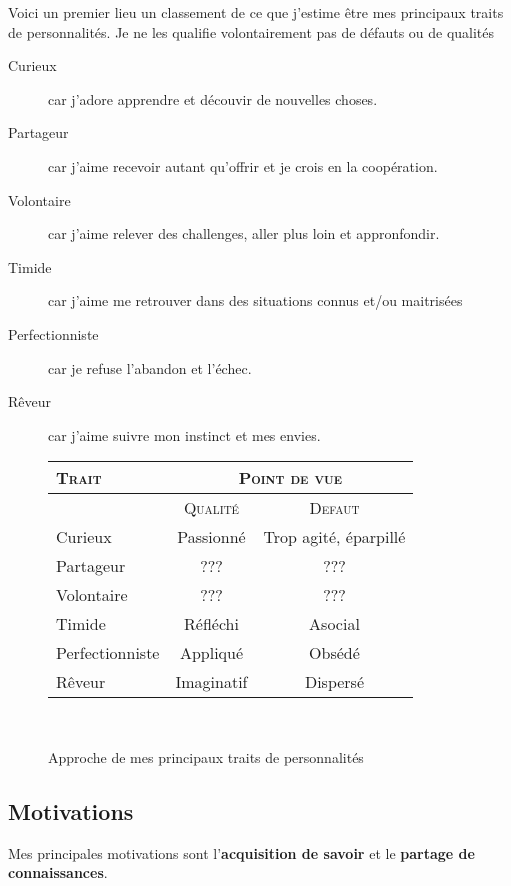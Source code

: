 \documentclass[a4paper,12pt, draft]{report}
\newcommand{\tabTitle}[1]{\hfill{} \textsc{#1} \hfill{} }
\begin{document}
Voici un premier lieu un classement de ce que j'estime être mes principaux traits de personnalités. Je ne les qualifie volontairement pas de défauts ou de qualités\\

\begin{description}
\item [Curieux]car j'adore apprendre et découvir de nouvelles choses.
\item [Partageur]car j'aime recevoir autant qu'offrir et je crois en la coopération.
\item [Volontaire]car j'aime relever des challenges, aller plus loin et appronfondir.
\item [Timide]car j'aime me retrouver dans des situations connus et/ou maitrisées
\item [Perfectionniste]car je refuse l'abandon et l'échec.
\item [Rêveur]car j'aime suivre mon instinct et mes envies.
\end{description}

\begin{figure}[h]
  \begin{tabular}{|l|c|c|}
    \hline
  \tabTitle{Trait} & \multicolumn{2}{c|}{\tabTitle{Point de vue}} \\
\hline
 & \tabTitle{Qualité} & \tabTitle{Defaut} \\
\hline
  Curieux & Passionné & Trop agité, éparpillé \\
  \hline
  Partageur & ??? & ???\\
  \hline
  Volontaire & ??? & ??? \\
  \hline
  Timide & Réfléchi & Asocial \\
  \hline
  Perfectionniste & Appliqué & Obsédé \\
  \hline
  Rêveur & Imaginatif & Dispersé \\
  \hline


    
  \end{tabular}\\
\caption{Approche de mes principaux traits de personnalités}
\end{figure}


\subsection{Motivations}
Mes principales motivations sont  l'\textbf{acquisition de savoir} et 
le \textbf{partage de connaissances}. 
\end{document}
